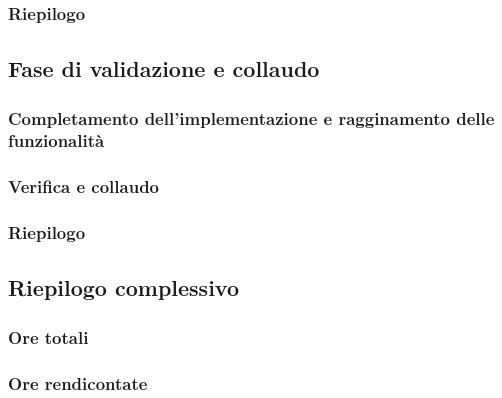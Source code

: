 \subsubsection{Riepilogo}


\subsection{Fase di validazione e collaudo}
\subsubsection{Completamento dell'implementazione e ragginamento delle funzionalità}
\subsubsection{Verifica e collaudo}
\subsubsection{Riepilogo}


\subsection{Riepilogo complessivo}
\subsubsection{Ore totali}
\subsubsection{Ore rendicontate}